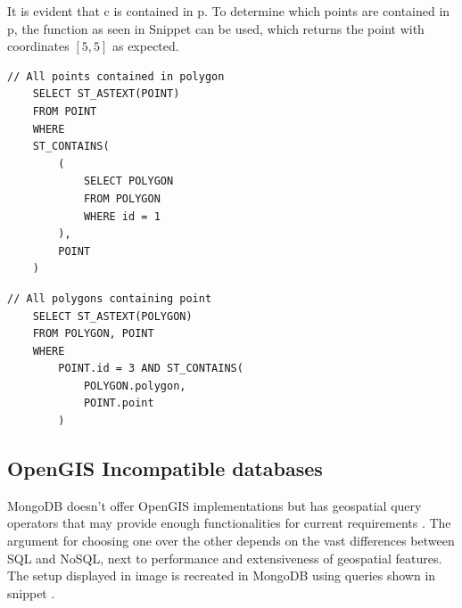 It is evident that c is contained in p. To determine which points are contained in p, the function as seen in Snippet  can be used, which returns the point with coordinates $[5, 5]$ as expected.

\begin{multicols}{2}
	\begin{lstlisting}[caption={Select points contained in polygon}, label={lst:sql-pts-in-poly}, belowskip=100pt]
	// All points contained in polygon
	SELECT ST_ASTEXT(POINT)
	FROM POINT
	WHERE
	ST_CONTAINS(
		(
			SELECT POLYGON
			FROM POLYGON
			WHERE id = 1
		),
		POINT
	)
\end{lstlisting}
	\begin{lstlisting}[caption={Select polygons containing point}, label={lst:sql-poly-has-pt}, belowskip=0pt]
	// All polygons containing point
	SELECT ST_ASTEXT(POLYGON)
	FROM POLYGON, POINT
	WHERE
		POINT.id = 3 AND ST_CONTAINS(
			POLYGON.polygon,
			POINT.point
		)
\end{lstlisting}
\end{multicols}

\subsection{OpenGIS Incompatible databases}
MongoDB doesn’t offer OpenGIS implementations but has geospatial query operators that may provide enough functionalities for current requirements . The argument for choosing one over the other depends on the vast differences between SQL and NoSQL, next to performance and extensiveness of geospatial features. The setup displayed in image  is recreated in MongoDB using queries shown in snippet .

